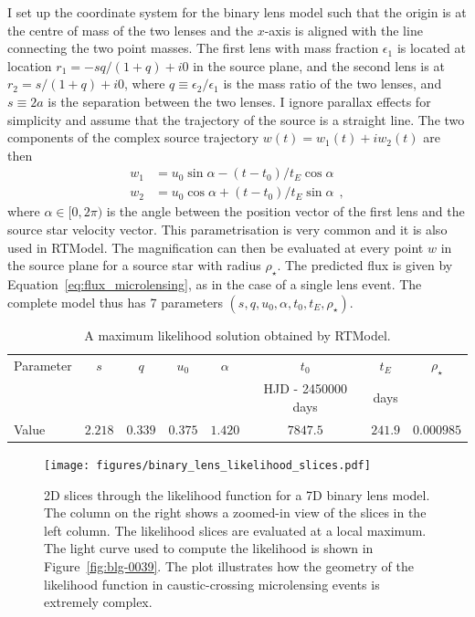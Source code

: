 \documentclass[12pt,dvipsnames]{report}
\newcommand{\hquad}{~~}
\begin{document}
I set up the coordinate system for the binary lens model such that the origin is at 
the centre of mass of the two lenses and the $x$-axis is aligned with the line connecting 
the two point masses.
The first lens with mass fraction $\epsilon_1$ is located at location $r_1=-sq/(1+q) +i0$ 
in the source plane, and the second lens is at $r_2=s/(1+q)+i0$, where 
$q\equiv \epsilon_2/\epsilon_1$ is the mass ratio
of the two lenses, and $s\equiv 2a$ is the separation between the two lenses.
I ignore parallax effects for simplicity and assume that the trajectory of the source 
is a straight line. The two components of the complex source trajectory 
$w(t)=w_1(t) + iw_2(t)$ are then 
\begin{align}
    w_1 &= u_0\sin\alpha - (t-t_0)/t_E\cos\alpha \\
    w_2 &= u_0\cos\alpha + (t-t_0)/t_E\sin\alpha
\hquad,
\end{align}
where $\alpha\in[0, 2\pi)$ is the angle between the position vector of the first lens 
and the source star velocity vector. This parametrisation is very common and it is also 
used in RTModel. The magnification can then be evaluated at every point $w$ in the 
source plane for a source star with radius $\rho_\star$. The predicted flux is given by 
Equation~\ref{eq:flux_microlensing}, as in the case of a single lens event. The complete 
model thus has 7 parameters $(s, q, u_0, \alpha, t_0, t_E, \rho_\star)$.

\begin{table}[h!]
\centering
\begin{tabular}{lccccccc}
 \toprule
Parameter & $s$ & $q$ & $u_0$& $\alpha$& $t_0$& $t_E$& $\rho_\star$\\
&&&&&HJD - 2450000 days& days&\\
 \midrule
Value & $2.218$ & $0.339$ & $0.375$ & $1.420$ & $7847.5$ & $241.9$ & $0.000985$\\
\bottomrule
\end{tabular}
\caption{A maximum likelihood solution obtained by RTModel.} 
\label{tab:rtmodel_solution}
\end{table}

\begin{figure}[!t]
    \begin{centering}
        \texttt{[image: figures/binary\_lens\_likelihood\_slices.pdf]}
        \caption{
            2D slices through the likelihood function for a 7D binary lens model. The column  
           on the right shows a zoomed-in view of the slices in the left column.
            The likelihood slices are evaluated at a local maximum. The light curve used to compute 
            the likelihood is shown in Figure~\ref{fig:blg-0039}. The plot illustrates 
            how the geometry of the likelihood function in caustic-crossing microlensing 
            events is extremely complex.
        }
            \label{fig:binary_lens_likelihood_slices}
    \end{centering}
\end{figure}
\end{document}
